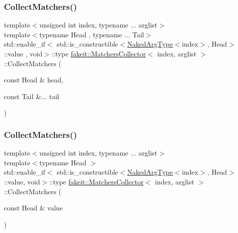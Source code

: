 \subsubsection{\texorpdfstring{CollectMatchers()}{CollectMatchers()}\hspace{0.1cm}{\footnotesize\ttfamily [26/63]}}
{\footnotesize\ttfamily template$<$unsigned int index, typename ... arglist$>$ \\
template$<$typename Head , typename ... Tail$>$ \\
std\+::enable\+\_\+if$<$ std\+::is\+\_\+constructible$<$\mbox{\hyperlink{classfakeit_1_1MatchersCollector_aeda8ced6a2f0cb7c6e4f916f18a91730}{Naked\+Arg\+Type}}$<$index$>$, Head$>$\+::value , void$>$\+::type \mbox{\hyperlink{classfakeit_1_1MatchersCollector}{fakeit\+::\+Matchers\+Collector}}$<$ index, arglist $>$\+::Collect\+Matchers (\begin{DoxyParamCaption}\item[{const Head \&}]{head,  }\item[{const Tail \&...}]{tail }\end{DoxyParamCaption})\hspace{0.3cm}{\ttfamily [inline]}}

\mbox{\label{classfakeit_1_1MatchersCollector_affd243a89f758239d77c70dce6318087}} 
\subsubsection{\texorpdfstring{CollectMatchers()}{CollectMatchers()}\hspace{0.1cm}{\footnotesize\ttfamily [27/63]}}
{\footnotesize\ttfamily template$<$unsigned int index, typename ... arglist$>$ \\
template$<$typename Head $>$ \\
std\+::enable\+\_\+if$<$ std\+::is\+\_\+constructible$<$\mbox{\hyperlink{classfakeit_1_1MatchersCollector_aeda8ced6a2f0cb7c6e4f916f18a91730}{Naked\+Arg\+Type}}$<$index$>$, Head$>$\+::value, void$>$\+::type \mbox{\hyperlink{classfakeit_1_1MatchersCollector}{fakeit\+::\+Matchers\+Collector}}$<$ index, arglist $>$\+::Collect\+Matchers (\begin{DoxyParamCaption}\item[{const Head \&}]{value }\end{DoxyParamCaption})\hspace{0.3cm}{\ttfamily [inline]}}

